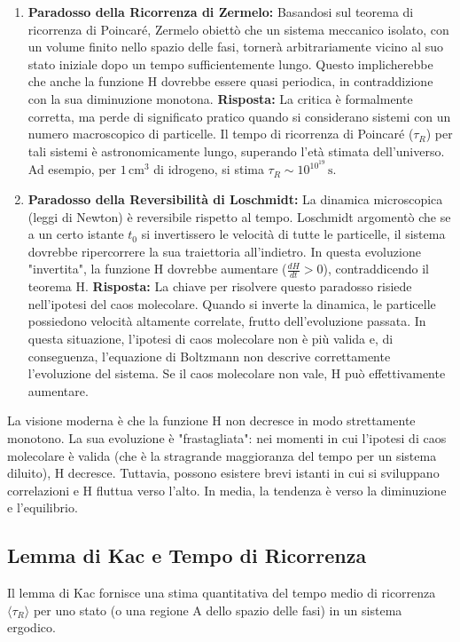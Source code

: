 \begin{enumerate}
    \item \textbf{Paradosso della Ricorrenza di Zermelo:} Basandosi sul teorema di ricorrenza di Poincaré, Zermelo obiettò che un sistema meccanico isolato, con un volume finito nello spazio delle fasi, tornerà arbitrariamente vicino al suo stato iniziale dopo un tempo sufficientemente lungo. Questo implicherebbe che anche la funzione H dovrebbe essere quasi periodica, in contraddizione con la sua diminuzione monotona.
    \newline
    \textbf{Risposta:} La critica è formalmente corretta, ma perde di significato pratico quando si considerano sistemi con un numero macroscopico di particelle. Il tempo di ricorrenza di Poincaré ($\tau_R$) per tali sistemi è astronomicamente lungo, superando l'età stimata dell'universo. Ad esempio, per $1 \, \text{cm}^3$ di idrogeno, si stima $\tau_R \sim 10^{10^{19}} \, \text{s}$.

    \item \textbf{Paradosso della Reversibilità di Loschmidt:} La dinamica microscopica (leggi di Newton) è reversibile rispetto al tempo. Loschmidt argomentò che se a un certo istante $t_0$ si invertissero le velocità di tutte le particelle, il sistema dovrebbe ripercorrere la sua traiettoria all'indietro. In questa evoluzione "invertita", la funzione H dovrebbe aumentare ($\frac{dH}{dt} > 0$), contraddicendo il teorema H.
    \newline
    \textbf{Risposta:} La chiave per risolvere questo paradosso risiede nell'ipotesi del caos molecolare. Quando si inverte la dinamica, le particelle possiedono velocità altamente correlate, frutto dell'evoluzione passata. In questa situazione, l'ipotesi di caos molecolare non è più valida e, di conseguenza, l'equazione di Boltzmann non descrive correttamente l'evoluzione del sistema. Se il caos molecolare non vale, H può effettivamente aumentare.
\end{enumerate}

La visione moderna è che la funzione H non decresce in modo strettamente monotono. La sua evoluzione è "frastagliata": nei momenti in cui l'ipotesi di caos molecolare è valida (che è la stragrande maggioranza del tempo per un sistema diluito), H decresce. Tuttavia, possono esistere brevi istanti in cui si sviluppano correlazioni e H fluttua verso l'alto. In media, la tendenza è verso la diminuzione e l'equilibrio.

\subsection{Lemma di Kac e Tempo di Ricorrenza}
Il lemma di Kac fornisce una stima quantitativa del tempo medio di ricorrenza $\langle\tau_R\rangle$ per uno stato (o una regione A dello spazio delle fasi) in un sistema ergodico.

